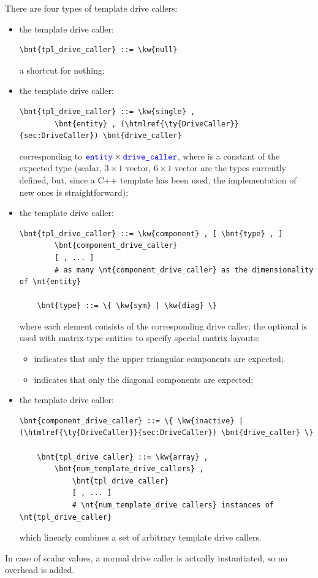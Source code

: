 There are four types of template drive callers:
\begin{itemize}
\item the  template drive caller:
\begin{Verbatim}[commandchars=\\\{\}]
    \bnt{tpl_drive_caller} ::= \kw{null}
\end{Verbatim}
a shortcut for nothing;
\item the  template drive caller:
\begin{Verbatim}[commandchars=\\\{\}]
    \bnt{tpl_drive_caller} ::= \kw{single} ,
        \bnt{entity} , (\htmlref{\ty{DriveCaller}}{sec:DriveCaller}) \bnt{drive_caller}
\end{Verbatim}
corresponding to $\textcolor{blue}{\texttt{entity}}\times\textcolor{blue}{\texttt{drive\_caller}}$,
where  is a constant of the expected type (scalar, $3 \times 1$ 
vector, $6 \times 1$ vector are the types currently defined, but, since 
a C++ template has been used, the implementation of new ones 
is straightforward);

\item the  template drive caller:
\begin{Verbatim}[commandchars=\\\{\}]
    \bnt{tpl_drive_caller} ::= \kw{component} , [ \bnt{type} , ]
        \bnt{component_drive_caller}
        [ , ... ]
        # as many \nt{component_drive_caller} as the dimensionality of \nt{entity}

    \bnt{type} ::= \{ \kw{sym} | \kw{diag} \}
\end{Verbatim}
where each element consists of the corresponding drive caller;
the optional  is used with matrix-type entities to specify
special matrix layouts:
\begin{itemize}
\item {} indicates that only the upper triangular components are expected;
\item {} indicates that only the diagonal components are expected;
\end{itemize}

\item the  template drive caller:
\begin{Verbatim}[commandchars=\\\{\}]
    \bnt{component_drive_caller} ::= \{ \kw{inactive} | (\htmlref{\ty{DriveCaller}}{sec:DriveCaller}) \bnt{drive_caller} \}

    \bnt{tpl_drive_caller} ::= \kw{array} ,
        \bnt{num_template_drive_callers} ,
            \bnt{tpl_drive_caller}
            [ , ... ]
            # \nt{num_template_drive_callers} instances of \nt{tpl_drive_caller}
\end{Verbatim}
which linearly combines a set of arbitrary template drive callers.
\end{itemize}
In case of scalar values, a normal drive caller is actually instantiated,
so no overhead is added.

